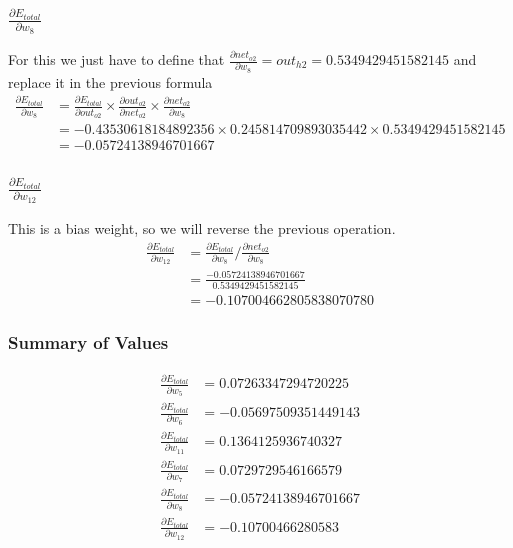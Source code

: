 \documentclass{article}
\begin{document}
\subsubsection{$\frac{\partial E_{total}}{\partial w_8}$}
For this we just have to define that $
    \frac{\partial net_{o2}}{\partial w_8} = out_{h2} = 0.5349429451582145
$ and replace it in the previous formula
\begin{align*}
    \frac{\partial E_{total}}{\partial w_8} & =
    \frac{\partial E_{total}}{\partial out_{o2}} \times
    \frac{\partial out_{o2}}{\partial net_{o2}} \times
    \frac{\partial net_{o2}}{\partial w_8} \\
    & = -0.43530618184892356 \times 0.245814709893035442 \times 0.5349429451582145 \\
    & = -0.05724138946701667
\end{align*}

\subsubsection{$\frac{\partial E_{total}}{\partial w_{12}}$}
This is a bias weight, so we will reverse the previous operation.
\begin{align*}
    \frac{\partial E_{total}}{\partial w_{12}} & = 
    \frac{\partial E_{total}}{\partial w_8} /
    \frac{\partial net_{o2}}{\partial w_8} \\
    & = \frac{-0.05724138946701667}{0.5349429451582145} \\
    & = -0.107004662805838070780 
\end{align*}

\subsubsection{Summary of Values}
\begin{align*}
    \frac{\partial E_{total}}{\partial w_5} &= 0.07263347294720225 \\
    \frac{\partial E_{total}}{\partial w_6} &= -0.05697509351449143 \\
    \frac{\partial E_{total}}{\partial w_{11}} &= 0.1364125936740327 \\
    \frac{\partial E_{total}}{\partial w_7} &= 0.0729729546166579 \\
    \frac{\partial E_{total}}{\partial w_8} &= -0.05724138946701667 \\
    \frac{\partial E_{total}}{\partial w_{12}} &= -0.10700466280583\\
\end{align*}
\end{document}
